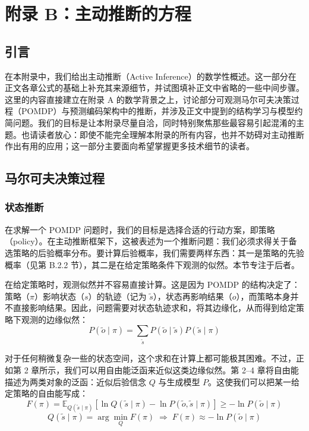 \chapter{附录 B：主动推断的方程}

\section{引言}

在本附录中，我们给出主动推断（Active Inference）的数学性概述。这一部分在正文各章公式的基础上补充其来源细节，并试图填补正文中省略的一些中间步骤。这里的内容直接建立在附录 A 的数学背景之上，讨论部分可观测马尔可夫决策过程（POMDP）与预测编码架构中的推断，并涉及正文中提到的结构学习与模型约简问题。我们的目标是让本附录尽量自洽，同时特别聚焦那些最容易引起混淆的主题。也请读者放心：即使不能完全理解本附录的所有内容，也并不妨碍对主动推断作出有用的应用；这一部分主要面向希望掌握更多技术细节的读者。

\section{马尔可夫决策过程}

\subsection{状态推断}

在求解一个 POMDP 问题时，我们的目标是选择合适的行动方案，即策略（policy）。在主动推断框架下，这被表述为一个推断问题：我们必须求得关于备选策略的后验概率分布。要计算后验概率，我们需要两样东西：其一是策略的先验概率（见第 \textsection B.2.2 节），其二是在给定策略条件下观测的似然。本节专注于后者。

在给定策略时，观测似然并不容易直接计算。这是因为 POMDP 的结构决定了：策略（$\pi$）影响状态（$s$）的轨迹（记为 $\tilde{s}$），状态再影响结果（$o$），而策略本身并不直接影响结果。因此，问题需要对状态轨迹求和，将其边缘化，从而得到给定策略下观测的边缘似然：
\begin{equation}
P(\tilde{o}\mid \pi)=\sum_{\tilde{s}} P(\tilde{o}\mid \tilde{s})P(\tilde{s}\mid \pi)
\tag{B.1}
\end{equation}

对于任何稍微复杂一些的状态空间，这个求和在计算上都可能极其困难。不过，正如第 2 章所示，我们可以用自由能泛函来近似这类边缘似然。第 2--4 章将自由能描述为两类对象的泛函：近似后验信念 $Q$ 与生成模型 $P$。这使我们可以把某一给定策略的自由能写成：
\begin{equation}
F(\pi)=\mathbb{E}_{Q(\tilde{s}\mid \pi)}\!\left[\ln Q(\tilde{s}\mid \pi)-\ln P(\tilde{o},\tilde{s}\mid \pi)\right]\ge -\ln P(\tilde{o}\mid \pi)
\tag{B.2}
\end{equation}
\begin{equation}
Q(\tilde{s}\mid \pi)=\arg\min_Q F(\pi)\;\Rightarrow\;F(\pi)\approx -\ln P(\tilde{o}\mid \pi)
\tag{B.2续}
\end{equation}

